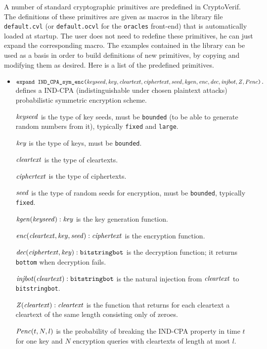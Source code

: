 \documentclass{article}
\begin{document}
A number of standard cryptographic primitives are predefined in
CryptoVerif.  The definitions of these primitives are given as macros
in the library file \texttt{default.cvl} (or \texttt{default.ocvl} for
the \texttt{oracles} front-end) that is automatically loaded at
startup.  The user does not need to redefine these primitives, he can
just expand the corresponding macro. The examples contained in the library
can be used as a basis in order to build definitions of new primitives, by copying
and modifying them as desired. Here is a list of the predefined primitives.
\begin{itemize}

\item $\texttt{expand IND\_CPA\_sym\_enc(}\mathit{keyseed}, \mathit{key},
  \mathit{cleartext}, \mathit{ciphertext}, \mathit{seed}, \mathit{kgen}, \mathit{enc},
  \mathit{dec}, \mathit{injbot}, \allowbreak \mathit{Z}, \allowbreak \mathit{Penc}\texttt{).}$ defines a
  IND-CPA (indistinguishable under chosen plaintext attacks)
  probabilistic symmetric encryption scheme.

   $\mathit{keyseed}$ is the type of key seeds, must be \texttt{bounded} (to be able to generate random numbers from it), typically \texttt{fixed} and \texttt{large}.

   $\mathit{key}$ is the type of keys, must be \texttt{bounded}.

   $\mathit{cleartext}$ is the type of cleartexts.

   $\mathit{ciphertext}$ is the type of ciphertexts.

   $\mathit{seed}$ is the type of random seeds for encryption, must be \texttt{bounded}, typically \texttt{fixed}.

   $\mathit{kgen}(\mathit{keyseed}): \mathit{key}$ is the key generation function.

   $\mathit{enc}(\mathit{cleartext}, \mathit{key}, \mathit{seed}): \mathit{ciphertext}$ is the encryption function.

   $\mathit{dec}(\mathit{ciphertext}, \mathit{key}): \texttt{bitstringbot}$ is the
  decryption function; it returns \texttt{bottom} when decryption
  fails.

   $\mathit{injbot}(\mathit{cleartext}): \texttt{bitstringbot}$ is the natural
  injection from $\mathit{cleartext}$ to \texttt{bitstringbot}.

   $\mathit{Z}(\mathit{cleartext}): \mathit{cleartext}$ is the function that
  returns for each cleartext a cleartext of the same length consisting
  only of zeroes.

  $\mathit{Penc}(t, N, l)$ is the probability of breaking the IND-CPA
  property in time $t$ for one key and $N$ encryption queries with
  cleartexts of length at most $l$.


\end{itemize}
\end{document}
